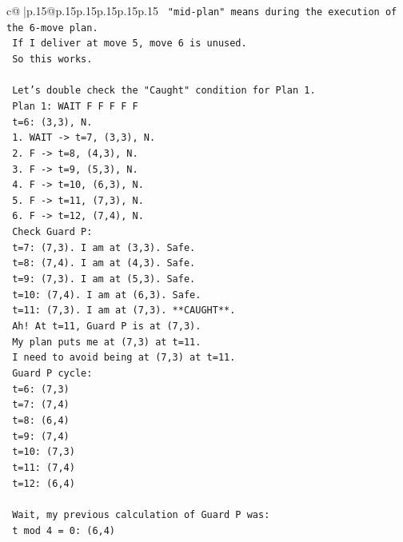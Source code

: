 \documentclass{article}
\begin{document}
{\begin{supertabular}{c@{$\;$}|p{.15\linewidth}@{}p{.15\linewidth}p{.15\linewidth}p{.15\linewidth}p{.15\linewidth}p{.15\linewidth}}
{{{\texttt{   "mid{-}plan" means during the execution of the 6{-}move plan.} \\
\texttt{   If I deliver at move 5, move 6 is unused.} \\
\texttt{   So this works.} \\
\\ 
\texttt{   Let's double check the "Caught" condition for Plan 1.} \\
\texttt{   Plan 1: WAIT F F F F F} \\
\texttt{   t=6: (3,3), N.} \\
\texttt{   1. WAIT {-}> t=7, (3,3), N.} \\
\texttt{   2. F {-}> t=8, (4,3), N.} \\
\texttt{   3. F {-}> t=9, (5,3), N.} \\
\texttt{   4. F {-}> t=10, (6,3), N.} \\
\texttt{   5. F {-}> t=11, (7,3), N.} \\
\texttt{   6. F {-}> t=12, (7,4), N.} \\
\texttt{   Check Guard P:} \\
\texttt{   t=7: (7,3). I am at (3,3). Safe.} \\
\texttt{   t=8: (7,4). I am at (4,3). Safe.} \\
\texttt{   t=9: (7,3). I am at (5,3). Safe.} \\
\texttt{   t=10: (7,4). I am at (6,3). Safe.} \\
\texttt{   t=11: (7,3). I am at (7,3). **CAUGHT**.} \\
\texttt{   Ah! At t=11, Guard P is at (7,3).} \\
\texttt{   My plan puts me at (7,3) at t=11.} \\
\texttt{   I need to avoid being at (7,3) at t=11.} \\
\texttt{   Guard P cycle:} \\
\texttt{   t=6: (7,3)} \\
\texttt{   t=7: (7,4)} \\
\texttt{   t=8: (6,4)} \\
\texttt{   t=9: (7,4)} \\
\texttt{   t=10: (7,3)} \\
\texttt{   t=11: (7,4)} \\
\texttt{   t=12: (6,4)} \\
\\ 
\texttt{   Wait, my previous calculation of Guard P was:} \\
\texttt{   t mod 4 = 0: (6,4)} \\
}}}
\end{supertabular}}
\end{document}

